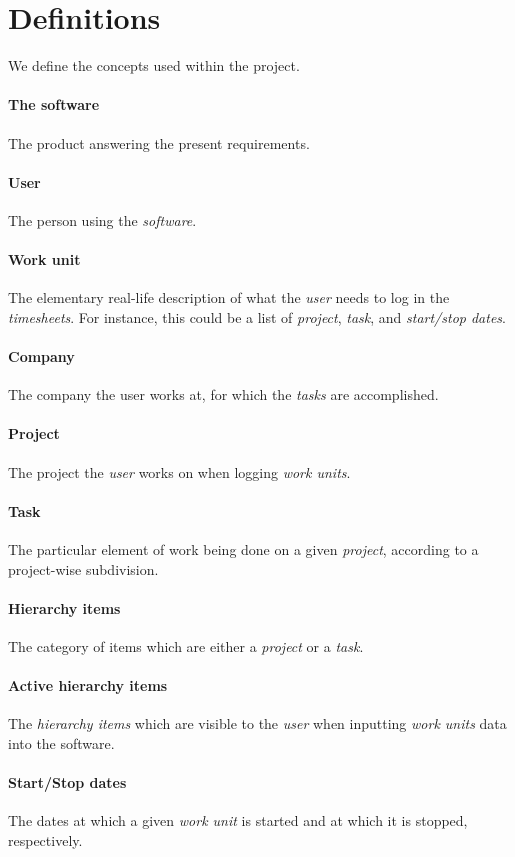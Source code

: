 \section{Definitions}
We define the concepts used within the project.

\paragraph{The software} The product answering the present requirements.
\paragraph{User} The person using the \emph{software}.
\paragraph{Work unit} The elementary real-life description of what the
  \emph{user} needs to log in the \emph{timesheets}. For instance, this could be
  a list of \emph{project}, \emph{task}, and \emph{start/stop dates}.
\paragraph{Company} The company the user works at, for which the
  \emph{tasks} are accomplished.
\paragraph{Project} The project the \emph{user} works on when logging
  \emph{work units}.
\paragraph{Task} The particular element of work being done on a given
  \emph{project}, according to a project-wise subdivision.
\paragraph{Hierarchy items} The category of items which are either a
  \emph{project} or a \emph{task}.
\paragraph{Active hierarchy items} The \emph{hierarchy items} which are
  visible to the \emph{user} when inputting \emph{work units} data into the
  software.
\paragraph{Start/Stop dates} The dates at which a given \emph{work unit} is
  started and at which it is stopped, respectively.
